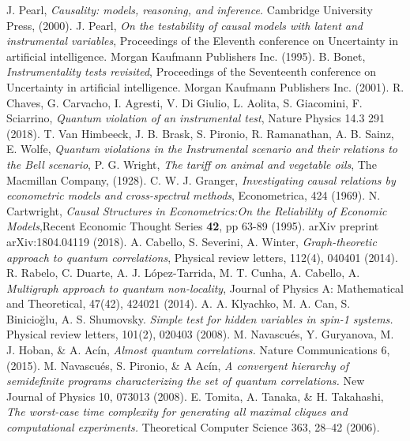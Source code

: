 \documentclass[letterpaper]{article}
\begin{document}
\begin{thebibliography}{}
     J. Pearl, 
        {\em Causality: models, reasoning, and inference.}
        Cambridge University Press, (2000).
     J. Pearl, 
        {\em On the testability of causal models with latent and instrumental variables}, 
        Proceedings of the Eleventh conference on Uncertainty in artificial
        intelligence. Morgan Kaufmann Publishers Inc. (1995).
     B. Bonet, {\em Instrumentality tests revisited},
        Proceedings of the Seventeenth conference on Uncertainty in artificial
        intelligence. Morgan Kaufmann Publishers Inc. (2001).
     R. Chaves, G. Carvacho, I. Agresti, V. Di Giulio, L. Aolita,
        S. Giacomini, F. Sciarrino, 
        {\em Quantum violation of an instrumental test}, 
        Nature Physics 14.3 291 (2018).
      T. Van Himbeeck, J. B. Brask, S. Pironio, R. Ramanathan, A. B. Sainz, E. Wolfe, 
        {\em Quantum violations in the Instrumental scenario and their relations to the Bell scenario},
     P. G. Wright, \emph{The tariff on animal and vegetable oils}, The Macmillan Company, (1928).
     C. W. J. Granger, \emph{Investigating causal relations by econometric models and cross-spectral methods}, Econometrica, 424 (1969).
     N. Cartwright, \emph{Causal Structures in Econometrics:On the Reliability of Economic Models},Recent Economic Thought Series \textbf{42}, pp 63-89 (1995).
        arXiv preprint arXiv:1804.04119 (2018).
      A. Cabello, S. Severini, A. Winter,
         {\em Graph-theoretic approach to quantum correlations}, 
         Physical review letters, 112(4), 040401 (2014).
      R. Rabelo, C. Duarte, A. J.  López-Tarrida, M. T. Cunha, A. Cabello, A. 
         {\em Multigraph approach to quantum non-locality},
         Journal of Physics A: Mathematical and Theoretical, 47(42), 424021
         (2014).
      A. A. Klyachko, M. A. Can, S. Binicioğlu, A. S. Shumovsky.
         {\em Simple test for hidden variables in spin-1 systems.}
         Physical review letters, 101(2), 020403 (2008).
      M. Navascués, Y. Guryanova, M. J. Hoban, \& A. Acín, 
         {\em Almost quantum correlations.}
         Nature Communications 6, (2015).
      M. Navascués, S. Pironio, \& A Acín, 
         {\em A convergent hierarchy of semidefinite programs characterizing the
         set of quantum correlations.}
         New Journal of Physics 10, 073013 (2008).
      E. Tomita, A. Tanaka, \& H. Takahashi,
         {\em The worst-case time complexity for generating all maximal cliques
         and computational experiments.} 
         Theoretical Computer Science 363, 28–42 (2006).
         

\end{thebibliography}
\end{document}
